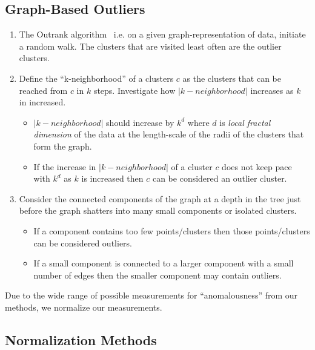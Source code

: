 \subsection{Graph-Based Outliers}

\begin{enumerate}
    \item The Outrank algorithm~\cite{moonesinghe_outrank:_2008} i.e. on a given graph-representation of data, initiate a random walk. The clusters that are visited least often are the outlier clusters.
    \item Define the ``k-neighborhood'' of a clusters $c$ as the clusters that can be reached from $c$ in $k$ steps. Investigate how $|k-neighborhood|$ increases as $k$ in increased.
    \begin{itemize}
        \item $|k-neighborhood|$ should increase by $k^d$ where $d$ is \textit{local fractal dimension} of the data at the length-scale of the radii of the clusters that form the graph.
        \item If the increase in $|k-neighborhood|$ of a cluster $c$ does not keep pace with $k^d$ as $k$ is increased then $c$ can be considered an outlier cluster.
    \end{itemize}
    \item Consider the connected components of the graph at a depth in the tree just before the graph shatters into many small components or isolated clusters.
    \begin{itemize}
        \item If a component contains too few points/clusters then those points/clusters can be considered outliers.
        \item If a small component is connected to a larger component with a small number of edges then the smaller component may contain outliers.
    \end{itemize}
\end{enumerate}

Due to the wide range of possible measurements for ``anomalousness'' from our methods, we normalize our measurements.

\subsection{Normalization Methods}

